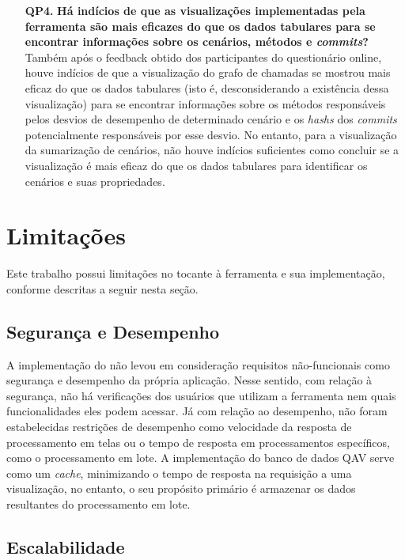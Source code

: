 \begin{itemize}
  \item[\textbf{QP4.}] \textbf{Há indícios de que as visualizações implementadas pela ferramenta são mais eficazes do que os dados tabulares para se encontrar informações sobre os cenários, métodos e \textit{commits}?} Também após o feedback obtido dos participantes do questionário online, houve indícios de que a visualização do grafo de chamadas se mostrou mais eficaz do que os dados tabulares (isto é, desconsiderando a existência dessa visualização) para se encontrar informações sobre os métodos responsáveis pelos desvios de desempenho de determinado cenário e os \textit{hashs} dos \textit{commits} potencialmente responsáveis por esse desvio. No entanto, para a visualização da sumarização de cenários, não houve indícios suficientes como concluir se a visualização é mais eficaz do que os dados tabulares para identificar os cenários e suas propriedades.
\end{itemize}

\section{Limitações} \label{sec:consideracoes-limitacoes}

Este trabalho possui limitações no tocante à ferramenta e sua implementação, conforme descritas a seguir nesta seção.

\subsection{Segurança e Desempenho} \label{subsec:consideracoes-limitacoes-seguranca-desempenho}

A implementação do \textit{\toolName} não levou em consideração requisitos não-funcionais como segurança e desempenho da própria aplicação. Nesse sentido, com relação à segurança, não há verificações dos usuários que utilizam a ferramenta nem quais funcionalidades eles podem acessar. Já com relação ao desempenho, não foram estabelecidas restrições de desempenho como velocidade da resposta de processamento em telas ou o tempo de resposta em processamentos específicos, como o processamento em lote. A implementação do banco de dados QAV serve como um \textit{cache}, minimizando o tempo de resposta na requisição a uma visualização, no entanto, o seu propósito primário é armazenar os dados resultantes do processamento em lote.

\subsection{Escalabilidade} \label{subsec:consideracoes-limitacoes-escalabilidade}

